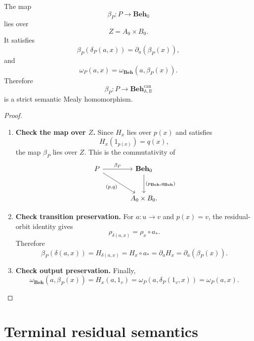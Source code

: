 \begin{proposition}
\label{prop:behaviour-assignment}
    The map
    \[
        \beta_P:P\to\mathbf{Beh}_0
    \]
    lies over
    \[
        Z=A_0\times B_0.
    \]
    It satisfies
    \[
        \beta_P(\delta_P(a,x))
        =
        \partial_a(\beta_P(x)),
    \]
    and
    \[
        \omega_P(a,x)
        =
        \omega_{\mathbf{Beh}}(a,\beta_P(x)).
    \]
    Therefore
    \[
        \beta_P:P\to\mathbf{Beh}^{\mathrm{can}}_{\mathbb A,\mathbb B}
    \]
    is a strict semantic Mealy homomorphism.
\end{proposition}
\begin{proof}
    \leavevmode
    \begin{enumerate}
        \item \textbf{Check the map over \(Z\).} Since \(H_x\) lies over \(p(x)\) and satisfies
        \[
            H_x(1_{p(x)})=q(x),
        \]
        the map \(\beta_P\) lies over \(Z\). This is the commutativity of
        \[
            \begin{tikzcd}[column sep=large, row sep=large]
                    P
                        \arrow[r, "\beta_P"]
                        \arrow[dr, "{(p,q)}"']
                &
                    \mathbf{Beh}_0
                        \arrow[d, "{(p_{\mathbf{Beh}},q_{\mathbf{Beh}})}"]
                \\
                &
                    A_0\times B_0.
            \end{tikzcd}
        \]

        \item \textbf{Check transition preservation.} For \(a:u\to v\) and \(p(x)=v\), the residual-orbit identity gives
        \[
            \rho_{\delta(a,x)}=\rho_x\circ a_*.
        \]
        Therefore
        \[
            \beta_P(\delta(a,x))
            =
            H_{\delta(a,x)}
            =
            H_x\circ a_*
            =
            \partial_aH_x
            =
            \partial_a(\beta_P(x)).
        \]

        \item \textbf{Check output preservation.} Finally,
        \[
            \omega_{\mathbf{Beh}}(a,\beta_P(x))
            =
            H_x(a,1_v)
            =
            \omega_P(a,\delta_P(1_v,x))
            =
            \omega_P(a,x).
        \]
    \end{enumerate}
\end{proof}

\section{Terminal residual semantics}
\label{sec:terminal-residual-semantics}

